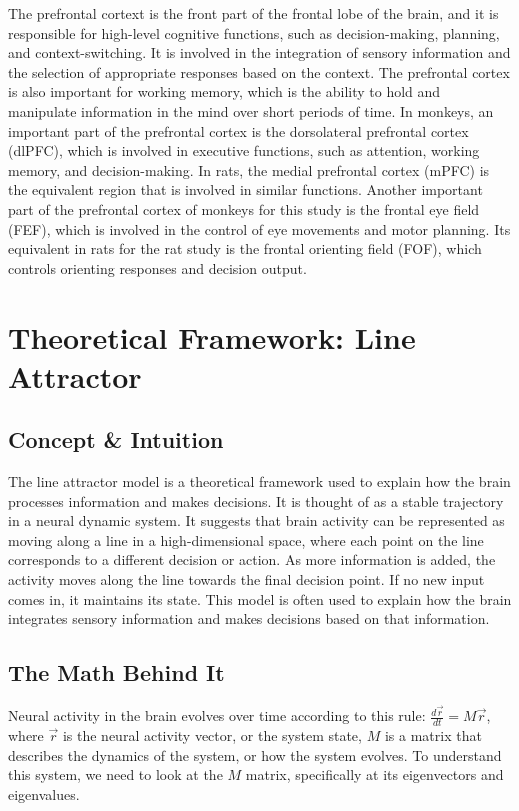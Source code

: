 \documentclass{article}
\begin{document}
The prefrontal cortext is the front part of the frontal lobe of the brain, and it is responsible for high-level cognitive functions, such as decision-making, planning, and context-switching. It is involved in the integration of sensory information and the selection of appropriate responses based on the context. The prefrontal cortex is also important for working memory, which is the ability to hold and manipulate information in the mind over short periods of time. In monkeys, an important part of the prefrontal cortex is the dorsolateral prefrontal cortex (dlPFC), which is involved in executive functions, such as attention, working memory, and decision-making. In rats, the medial prefrontal cortex (mPFC) is the equivalent region that is involved in similar functions. Another important part of the prefrontal cortex of monkeys for this study is the frontal eye field (FEF), which is involved in the control of eye movements and motor planning. Its equivalent in rats for the rat study is the frontal orienting field (FOF), which controls orienting responses and decision output.


\section{Theoretical Framework: Line Attractor}

\subsection{Concept \& Intuition}
The line attractor model is a theoretical framework used to explain how the brain processes information and makes decisions. It is thought of as a stable trajectory in a neural dynamic system. It suggests that brain activity can be represented as moving along a line in a high-dimensional space, where each point on the line corresponds to a different decision or action. As more information is added, the activity moves along the line towards the final decision point. If no new input comes in, it maintains its state. This model is often used to explain how the brain integrates sensory information and makes decisions based on that information.

\subsection{The Math Behind It}
Neural activity in the brain evolves over time according to this rule: 
$\frac{d\vec{r}}{dt} = M\vec{r}$, where $\vec{r}$ is the neural activity vector, or the system state, $M$ is a matrix that describes the dynamics of the system, or how the system evolves. To understand this system, we need to look at the $M$ matrix, specifically at its eigenvectors and eigenvalues.
\end{document}
